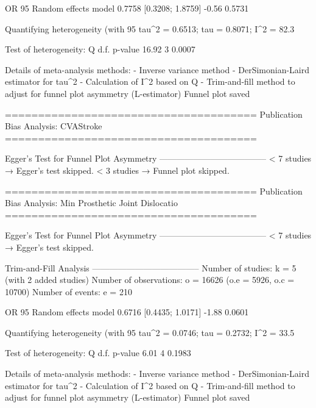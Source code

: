                          OR           95%
Random effects model 0.7758 [0.3208; 1.8759] -0.56  0.5731

Quantifying heterogeneity (with 95%
 tau^2 = 0.6513; tau = 0.8071; I^2 = 82.3%

Test of heterogeneity:
     Q d.f. p-value
 16.92    3  0.0007

Details of meta-analysis methods:
- Inverse variance method
- DerSimonian-Laird estimator for tau^2
- Calculation of I^2 based on Q
- Trim-and-fill method to adjust for funnel plot asymmetry (L-estimator)
  Funnel plot saved

======================================
Publication Bias Analysis: CVAStroke 
======================================
                                                                                                                                                        
Egger's Test for Funnel Plot Asymmetry
--------------------------------------
  < 7 studies → Egger’s test skipped.
  < 3 studies → Funnel plot skipped.

======================================
Publication Bias Analysis: Min Prosthetic Joint Dislocatio 
======================================
                                                                                                                                                        
Egger's Test for Funnel Plot Asymmetry
--------------------------------------
  < 7 studies → Egger’s test skipped.

Trim-and-Fill Analysis
--------------------------------------
Number of studies: k = 5 (with 2 added studies)
Number of observations: o = 16626 (o.e = 5926, o.c = 10700)
Number of events: e = 210

                         OR           95%
Random effects model 0.6716 [0.4435; 1.0171] -1.88  0.0601

Quantifying heterogeneity (with 95%
 tau^2 = 0.0746; tau = 0.2732; I^2 = 33.5%

Test of heterogeneity:
    Q d.f. p-value
 6.01    4  0.1983

Details of meta-analysis methods:
- Inverse variance method
- DerSimonian-Laird estimator for tau^2
- Calculation of I^2 based on Q
- Trim-and-fill method to adjust for funnel plot asymmetry (L-estimator)
  Funnel plot saved

